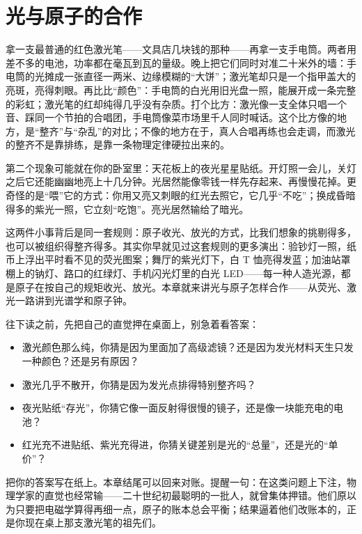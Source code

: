 \chapter{光与原子的合作}


\begin{mainline}
拿一支最普通的红色激光笔——文具店几块钱的那种——再拿一支手电筒。两者用差不多的电池，功率都在毫瓦到瓦的量级。晚上把它们同时对准二十米外的墙：手电筒的光摊成一张直径一两米、边缘模糊的“大饼”；激光笔却只是一个指甲盖大的亮斑，亮得刺眼。再比比“颜色”：手电筒的白光用旧光盘一照，能展开成一条完整的彩虹；激光笔的红却纯得几乎没有杂质。打个比方：激光像一支全体只唱一个音、踩同一个节拍的合唱团，手电筒像菜市场里千人同时喊话。这个比方像的地方，是“整齐”与“杂乱”的对比；不像的地方在于，真人合唱再练也会走调，而激光的整齐不是靠排练，是靠一条物理定律硬拉出来的。

第二个现象可能就在你的卧室里：天花板上的夜光星星贴纸。开灯照一会儿，关灯之后它还能幽幽地亮上十几分钟。光居然能像零钱一样先存起来、再慢慢花掉。更奇怪的是“喂”它的方式：你用又亮又刺眼的红光去照它，它几乎“不吃”；换成昏暗得多的紫光一照，它立刻“吃饱”。亮光居然输给了暗光。

这两件小事背后是同一套规则：原子收光、放光的方式，比我们想象的挑剔得多，也可以被组织得整齐得多。其实你早就见过这套规则的更多演出：验钞灯一照，纸币上浮出平时看不见的荧光图案；舞厅的紫光灯下，白 T 恤亮得发蓝；加油站罩棚上的钠灯、路口的红绿灯、手机闪光灯里的白光 LED——每一种人造光源，都是原子在按自己的规矩收光、放光。本章就来讲光与原子怎样合作——从荧光、激光一路讲到光谱学和原子钟。
\end{mainline}


\begin{mainline}
往下读之前，先把自己的直觉押在桌面上，别急着看答案：

\begin{itemize}[leftmargin=1.8em]
  \item 激光颜色那么纯，你猜是因为里面加了高级滤镜？还是因为发光材料天生只发一种颜色？还是另有原因？
  \item 激光几乎不散开，你猜是因为发光点排得特别整齐吗？
  \item 夜光贴纸“存光”，你猜它像一面反射得很慢的镜子，还是像一块能充电的电池？
  \item 红光充不进贴纸、紫光充得进，你猜关键差别是光的“总量”，还是光的“单价”？
\end{itemize}

把你的答案写在纸上。本章结尾可以回来对账。提醒一句：在这类问题上下注，物理学家的直觉也经常输——二十世纪初最聪明的一批人，就曾集体押错。他们原以为只要把电磁学算得再细一点，原子的账本总会平衡；结果逼着他们改账本的，正是你现在桌上那支激光笔的祖先们。
\end{mainline}

